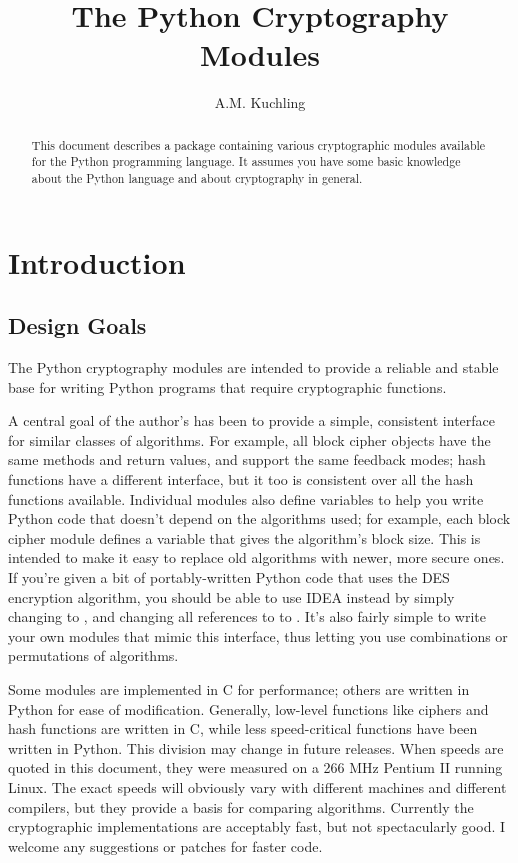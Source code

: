\documentclass{howto}
\title{The Python Cryptography Modules}
\author{A.M. Kuchling}
\begin{document}
\maketitle

\begin{abstract}
\noindent
This document describes a package containing various cryptographic
modules available for the Python programming language.  It assumes you
have some basic knowledge about the Python language and about
cryptography in general.
\end{abstract}

\tableofcontents

\section{Introduction}

\subsection{Design Goals}
The Python cryptography modules are intended to provide a reliable and
stable base for writing Python programs that require
cryptographic functions.  

A central goal of the author's has been to provide a
simple, consistent interface for similar classes of algorithms.  For
example, all block cipher objects have the same methods and return
values, and support the same feedback modes; hash functions have a
different interface, but it too is consistent over all the
hash functions available.  Individual modules also define variables to
help you write Python code that doesn't depend on the algorithms used;
for example, each block cipher module defines a variable that gives
the algorithm's block size.  This is intended to make it easy to
replace old algorithms with newer, more secure ones.  If you're given
a bit of portably-written Python code that uses the DES encryption
algorithm, you should be able to use IDEA instead by simply changing
 to , and changing all references to  
 to .  It's also fairly simple to write
your own modules that mimic this interface, thus letting you use
combinations or permutations of algorithms.

Some modules are implemented in C for performance; others are written in
Python for ease of modification.  Generally, low-level functions like
ciphers and hash functions are written in C, while less speed-critical
functions have been written in Python.  This division may change in
future releases.  When speeds are quoted in this document, they were
measured on a 266 MHz Pentium II running Linux.  The exact speeds will obviously
vary with different machines and different compilers, but they provide a
basis for comparing algorithms.  Currently the cryptographic
implementations are acceptably fast, but not spectacularly good.  I
welcome any suggestions or patches for faster code.  
\end{document}
